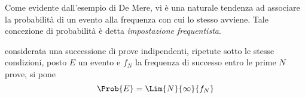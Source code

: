 \documentclass{subfiles}
\begin{document}
Come evidente dall'esempio di De Mere, vi è una naturale tendenza ad associare la probabilità di un evento alla frequenza con cui lo stesso avviene.
Tale concezione di probabilità è detta \emph{impostazione frequentista}.
\begin{Definition*}
    considerata una successione di prove indipendenti, ripetute sotto le stesse condizioni,
    posto $E$ un evento e $f_{N}$ la frequenza di successo entro le prime $N$ prove, si pone
    $$
        \Prob{E} = \Lim{N}{\infty}{f_{N}}
    $$
\end{Definition*}
\end{document}
